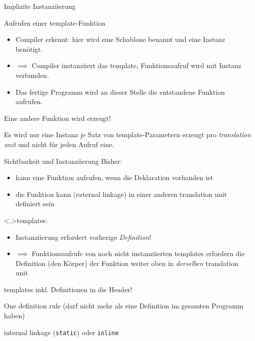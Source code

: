 \begin{frame}{Implizite Instanziierung}
	\begin{block}{Aufrufen einer template-Funktion}
		
	\end{block}
	
	\pause
	
	\begin{itemize}
		\item Compiler erkennt: hier wird eine Schablone benannt und eine Instanz benötigt. \\
		\item $\implies$ Compiler instanziiert das template, Funktionsaufruf wird mit Instanz verbunden.
		\item Das fertige Programm wird an dieser Stelle die entstandene Funktion aufrufen.
	\end{itemize}
	
	\pause
	
	
	Eine andere Funktion wird erzeugt!
	
	Es wird nur eine Instanz je Satz von template-Parametern erzeugt pro \emph{translation unit} und nicht für jeden Aufruf eine.
\end{frame}

\begin{frame}[fragile]{Sichtbarkeit und Instanziierung}
	\alert<+>{Bisher:}
	\begin{itemize}
		\item kann eine Funktion aufrufen, wenn die Deklaration vorhanden ist
		\item die Funktion kann (external linkage) in einer anderen translation unit definiert sein
	\end{itemize}
	
	\onslide<+->
	\vspace{0.5em}
	
	\alert<.>{templates:}
	\begin{itemize}
		\item Instanziierung erfordert vorherige \emph{Definition}!
		\item $\implies$ Funktionsaufrufe von noch nicht instanziierten templates erfordern die Definition (den Körper) der Funktion weiter oben in \emph{derselben} translation unit
	\end{itemize}
	
	\onslide<+->
	\vspace{0.5em}
	\begin{description}[leftmargin=3.5em]
		\item[\emph{common solution}] templates inkl. Definitionen in die Header!\\
		\item[\emph{Problem}] One definition rule {\tiny (darf nicht mehr als eine Definition im gesamten Programm haben) }\\
		\item[\emph{Umgehung}] internal linkage (\verb|static|) oder \verb|inline|
	\end{description}
\end{frame}

